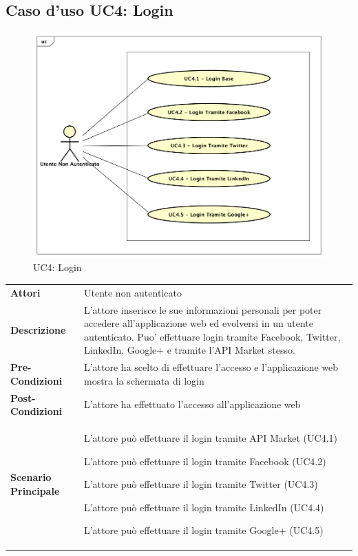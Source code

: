 \newpage
\subsection{Caso d'uso UC4:  Login}
\label{UC4}
\begin{figure}[ht]
	\centering
	\includegraphics[scale=0.45]{UML/UC4.png}
	\caption{UC4: Login}
\end{figure}

\begin{longtable}{ l | p{11cm}}
	\hline
	\rowcolor{Gray}
	 \multicolumn{2}{c}{UC4 - Login}\\
	 \hline
	\textbf{Attori} & Utente non autenticato \\
	\textbf{Descrizione} & L'attore inserisce le sue informazioni personali per poter accedere all'applicazione web ed evolversi in un utente autenticato. Puo' effettuare login tramite Facebook, Twitter, LinkedIn, Google+ e tramite l'API Market stesso. \\
	\textbf{Pre-Condizioni} & L'attore ha scelto di effettuare l'accesso e l'applicazione web mostra la schermata di login \\
	\textbf{Post-Condizioni} & L'attore ha effettuato l'accesso all'applicazione web \\
	\textbf{Scenario Principale} & \begin{enumerate*}[label=(\arabic*.),itemjoin={\newline}]
		\item L'attore può effettuare il login tramite API Market (UC4.1)
		\item L'attore può effettuare il login tramite Facebook (UC4.2)
		\item L'attore può effettuare il login tramite Twitter (UC4.3)
		\item L'attore può effettuare il login tramite LinkedIn (UC4.4)
		\item L'attore può effettuare il login tramite Google+ (UC4.5)
	\end{enumerate*}\\
\end{longtable}